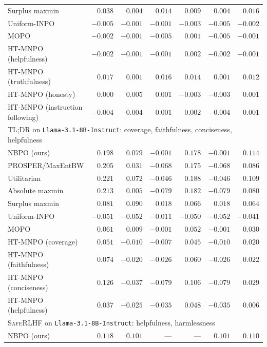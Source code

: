 \documentclass{article}
\theoremstyle{remark}
\theoremstyle{plain}
\newcommand{\NBPO}{\textsc{NBPO}}
\begin{document}
\begin{table}[t]
\begin{tabular}{lrrrrrr}
Surplus maxmin & $0.038$ & $0.004$ & $0.014$ & $0.009$ & $0.004$ & $0.016$\\
Uniform-INPO & $-0.005$ & $-0.001$ & $-0.001$ & $-0.003$ & $-0.005$ & $-0.002$\\
MOPO & $-0.002$ & $-0.001$ & $-0.005$ & $0.001$ & $-0.005$ & $-0.001$\\
HT-MNPO (helpfulness) & $-0.002$ & $-0.001$ & $-0.001$ & $0.002$ & $-0.002$ & $-0.001$\\
HT-MNPO (truthfulness) & $0.017$ & $0.001$ & $0.016$ & $0.014$ & $0.001$ & $0.012$\\
HT-MNPO (honesty) & $0.000$ & $0.005$ & $0.001$ & $-0.003$ & $-0.003$ & $0.001$\\
HT-MNPO (instruction following) & $-0.004$ & $0.004$ & $0.001$ & $0.002$ & $-0.004$ & $0.001$\\
\midrule
\multicolumn{7}{l}{\textsc{TL;DR} on \texttt{Llama-3.1-8B-Instruct}: coverage, faithfulness, conciseness, helpfulness}\\
\NBPO{} (ours) & $0.198$ & $0.079$ & $-0.001$ & $0.178$ & $-0.001$ & $0.114$\\
PROSPER/MaxEntBW & $0.205$ & $0.031$ & $-0.068$ & $0.175$ & $-0.068$ & $0.086$\\
Utilitarian & $0.221$ & $0.072$ & $-0.046$ & $0.188$ & $-0.046$ & $0.109$\\
Absolute maxmin & $0.213$ & $0.005$ & $-0.079$ & $0.182$ & $-0.079$ & $0.080$\\
Surplus maxmin & $0.081$ & $0.090$ & $0.018$ & $0.066$ & $0.018$ & $0.064$\\
Uniform-INPO & $-0.051$ & $-0.052$ & $-0.011$ & $-0.050$ & $-0.052$ & $-0.041$\\
MOPO & $0.061$ & $0.009$ & $-0.001$ & $0.052$ & $-0.001$ & $0.030$\\
HT-MNPO (coverage) & $0.051$ & $-0.010$ & $-0.007$ & $0.045$ & $-0.010$ & $0.020$\\
HT-MNPO (faithfulness) & $0.074$ & $-0.020$ & $-0.026$ & $0.060$ & $-0.026$ & $0.022$\\
HT-MNPO (conciseness) & $0.126$ & $-0.037$ & $-0.079$ & $0.106$ & $-0.079$ & $0.029$\\
HT-MNPO (helpfulness) & $0.037$ & $-0.025$ & $-0.035$ & $0.048$ & $-0.035$ & $0.006$\\
\midrule
\multicolumn{7}{l}{\textsc{SafeRLHF} on \texttt{Llama-3.1-8B-Instruct}: helpfulness, harmlessness}\\
\NBPO{} (ours) & $0.118$ & $0.101$ & --- & --- & $0.101$ & $0.110$\\

\end{tabular}
\end{table}
\end{document}
